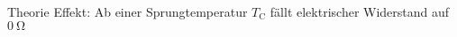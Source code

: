 \begin{frame}{Theorie}
Effekt: Ab einer Sprungtemperatur $T_{\mathup{C}}$ fällt elektrischer Widerstand auf $\SI{0}{\ohm}$ 



\end{frame}
